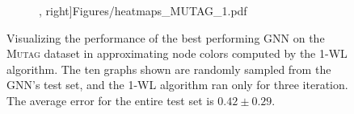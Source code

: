 \begin{figure}[!ht]
\begin{subfigure}[b]{0.53007147296\textwidth}
, right]{Figures/heatmaps_MUTAG_1.pdf}
    \end{subfigure}
    \hfill
    \caption{Visualizing the performance of the best performing GNN on the \textsc{Mutag} dataset in approximating node colors computed by the 1-WL algorithm. The ten graphs shown are randomly sampled from the GNN's test set, and the 1-WL algorithm ran only for three iteration. The average error for the entire test set is $0.42 \pm 0.29$.}
    \label{fig:gnn_approx_mutag}
\end{figure}

